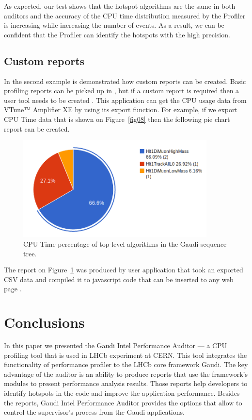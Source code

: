 \documentclass[a4paper]{jpconf}
\begin{document}
As expected, our test shows that the hotspot algorithms are the same in both auditors and the accuracy of 
the CPU time distribution measured by the Profiler is increasing while increasing the number of events. 
As a result, we can be confident that the Profiler can identify the hotspots with the high precision.

\subsection{Custom reports}

In the second example is demonstrated how custom reports can be created. Basic profiling reports can be picked up in 
\amp, but if a custom report is required then a user tool needs to be created . This application can get the CPU usage 
data from VTune™ Amplifier XE by using its export function. For example, if we export CPU Time data that is shown on 
Figure~\ref{fig08} then the following pie chart report can be created.

\begin{figure}[H]
\begin{minipage}{\textwidth}
\begin{center}
\includegraphics[width=100mm]{figs/fig12.png}
\caption{\label{fig12}CPU Time percentage of top-level algorithms in the Gaudi sequence tree.}
\end{center}
\end{minipage}
\end{figure}

The report on Figure~\ref{fig12} was produced by user application that took an exported CSV data and compiled it to 
javascript code that can be inserted to any web page \cite{reports}.

\section{Conclusions}
In this paper we presented the Gaudi Intel Performance Auditor --- a CPU profiling tool that is used 
in LHCb experiment at CERN. This tool integrates the functionality of \iamp performance profiler to 
the LHCb core framework Gaudi. The key advantage of the auditor is an ability to produce reports that use 
the framework’s modules to present performance analysis results. Those reports help  developers to identify hotspots in 
the code and improve the application performance. Besides the reports, Gaudi Intel Performance Auditor provides 
the options that allow to control the \iamp supervisor’s process from the Gaudi applications.
\end{document}
